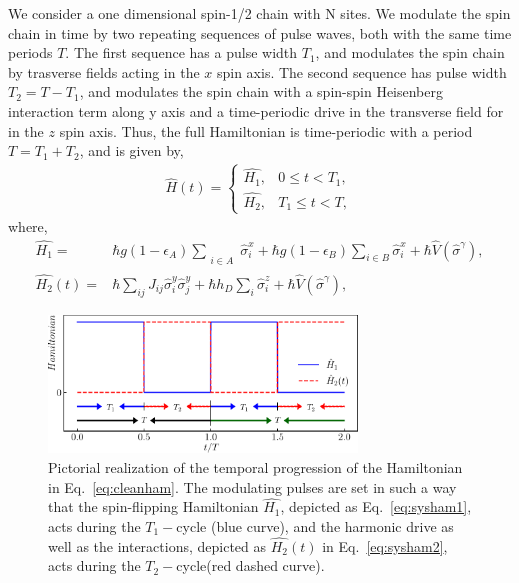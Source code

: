 \documentclass[
nofootinbib,
reprint,
superscriptaddress,
amsmath,amssymb,showkeys,
aps,
prb,
]{revtex4-2}
\begin{document}
	We consider a one dimensional spin-1/2 chain with N sites.  We modulate the spin chain in time by two repeating sequences of pulse waves, both with the same time periods $T$.  The first sequence has a pulse width $T_1$, and modulates the spin chain by trasverse fields acting in the $x$ spin axis. The second  sequence has pulse width $T_2=T-T_1$, and modulates the spin chain with a spin-spin Heisenberg interaction term along y axis and a time-periodic drive in the transverse field for in the $z$ spin axis. Thus, the full Hamiltonian is time-periodic with a period $T=T_1+T_2$, and is given by,
	\begin{align}
		\hat{H}(t) = 
		\begin{cases}
			\hat{H_1} , & 0\leq t < T_1,\\
			\hat{H_2} , & T_1\leq t < T,
		\end{cases}
		\label{eq:cleanham}
	\end{align}
	where,
	\begin{align}
		\hat{H_1} = & \hbar g (1-\epsilon_A) \sum_{\substack{\\i \in A}}\hat{\sigma}^x_i + \hbar g (1-\epsilon_B) \sum_{i \in B}\hat{\sigma}^x_i+ \hbar\hat{V}(\hat{\sigma}^{\gamma}),\label{eq:sysham1}\\
		\hat{H_2}(t) = & \hbar\sum_{ij} J_{ij} \hat{\sigma}^y_i \hat{\sigma}^y_{j} +  \hbar h_D \sum_i \hat{\sigma}^z_i + \hbar\hat{V}(\hat{\sigma}^{\gamma}),
		\label{eq:sysham2}
	\end{align}
	\begin{figure}
		\begin{center}
			\includegraphics[width=8.2cm]{drive_distribution.pdf}
		\end{center}
		\caption{Pictorial realization of the temporal progression of the Hamiltonian in Eq.~\eqref{eq:cleanham}. The modulating pulses are set in such a way that the spin-flipping Hamiltonian $\hat{H_1}$, depicted as Eq.~\eqref{eq:sysham1}, acts during the $T_1-$cycle (blue curve), and the harmonic drive as well as the interactions, depicted as $\hat{H_2}(t)$ in Eq.~\eqref{eq:sysham2}, acts during the $T_2-$cycle(red dashed curve).}
		\label{Fig:time_distribution}
	\end{figure}	
\end{document}
